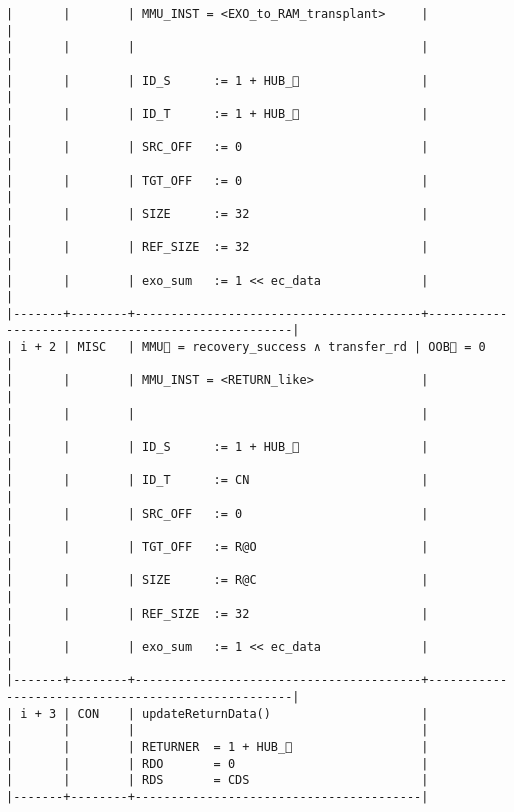 \documentclass[varwidth=\maxdimen,margin=0.5cm,multi={verbatim}]{standalone}
\begin{document}
\begin{verbatim}
|       |        | MMU_INST = <EXO_to_RAM_transplant>     |                                                   |
|       |        |                                        |                                                   |
|       |        | ID_S      := 1 + HUB_                 |                                                   |
|       |        | ID_T      := 1 + HUB_                 |                                                   |
|       |        | SRC_OFF   := 0                         |                                                   |
|       |        | TGT_OFF   := 0                         |                                                   |
|       |        | SIZE      := 32                        |                                                   |
|       |        | REF_SIZE  := 32                        |                                                   |
|       |        | exo_sum   := 1 << ec_data              |                                                   |
|-------+--------+----------------------------------------+---------------------------------------------------|
| i + 2 | MISC   | MMU🏴 = recovery_success ∧ transfer_rd | OOB🏴 = 0                                         |
|       |        | MMU_INST = <RETURN_like>               |                                                   |
|       |        |                                        |                                                   |
|       |        | ID_S      := 1 + HUB_                 |                                                   |
|       |        | ID_T      := CN                        |                                                   |
|       |        | SRC_OFF   := 0                         |                                                   |
|       |        | TGT_OFF   := R@O                       |                                                   |
|       |        | SIZE      := R@C                       |                                                   |
|       |        | REF_SIZE  := 32                        |                                                   |
|       |        | exo_sum   := 1 << ec_data              |                                                   |
|-------+--------+----------------------------------------+---------------------------------------------------|
| i + 3 | CON    | updateReturnData()                     |
|       |        |                                        |
|       |        | RETURNER  = 1 + HUB_                  |
|       |        | RDO       = 0                          |
|       |        | RDS       = CDS                        |
|-------+--------+----------------------------------------|
\end{verbatim}
\end{document}
